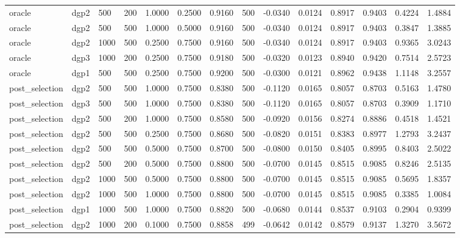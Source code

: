 \begin{tabular}{llllllllllllll}
oracle & dgp2 & 500 & 200 & 1.0000 & 0.2500 & 0.9160 & 500 & -0.0340 & 0.0124 & 0.8917 & 0.9403 & 0.4224 & 1.4884 \\
oracle & dgp2 & 500 & 500 & 1.0000 & 0.5000 & 0.9160 & 500 & -0.0340 & 0.0124 & 0.8917 & 0.9403 & 0.3847 & 1.3885 \\
oracle & dgp2 & 1000 & 500 & 0.2500 & 0.7500 & 0.9160 & 500 & -0.0340 & 0.0124 & 0.8917 & 0.9403 & 0.9365 & 3.0243 \\
oracle & dgp3 & 1000 & 200 & 0.2500 & 0.7500 & 0.9180 & 500 & -0.0320 & 0.0123 & 0.8940 & 0.9420 & 0.7514 & 2.5723 \\
oracle & dgp1 & 500 & 500 & 0.2500 & 0.7500 & 0.9200 & 500 & -0.0300 & 0.0121 & 0.8962 & 0.9438 & 1.1148 & 3.2557 \\
post\_selection & dgp2 & 500 & 500 & 1.0000 & 0.7500 & 0.8380 & 500 & -0.1120 & 0.0165 & 0.8057 & 0.8703 & 0.5163 & 1.4780 \\
post\_selection & dgp3 & 500 & 500 & 1.0000 & 0.7500 & 0.8380 & 500 & -0.1120 & 0.0165 & 0.8057 & 0.8703 & 0.3909 & 1.1710 \\
post\_selection & dgp2 & 500 & 200 & 1.0000 & 0.7500 & 0.8580 & 500 & -0.0920 & 0.0156 & 0.8274 & 0.8886 & 0.4518 & 1.4521 \\
post\_selection & dgp2 & 500 & 500 & 0.2500 & 0.7500 & 0.8680 & 500 & -0.0820 & 0.0151 & 0.8383 & 0.8977 & 1.2793 & 3.2437 \\
post\_selection & dgp2 & 500 & 500 & 0.5000 & 0.7500 & 0.8700 & 500 & -0.0800 & 0.0150 & 0.8405 & 0.8995 & 0.8403 & 2.5022 \\
post\_selection & dgp2 & 500 & 200 & 0.5000 & 0.7500 & 0.8800 & 500 & -0.0700 & 0.0145 & 0.8515 & 0.9085 & 0.8246 & 2.5135 \\
post\_selection & dgp2 & 1000 & 500 & 0.5000 & 0.7500 & 0.8800 & 500 & -0.0700 & 0.0145 & 0.8515 & 0.9085 & 0.5695 & 1.8357 \\
post\_selection & dgp2 & 1000 & 500 & 1.0000 & 0.7500 & 0.8800 & 500 & -0.0700 & 0.0145 & 0.8515 & 0.9085 & 0.3385 & 1.0084 \\
post\_selection & dgp1 & 1000 & 500 & 1.0000 & 0.7500 & 0.8820 & 500 & -0.0680 & 0.0144 & 0.8537 & 0.9103 & 0.2904 & 0.9399 \\
post\_selection & dgp2 & 1000 & 200 & 0.1000 & 0.7500 & 0.8858 & 499 & -0.0642 & 0.0142 & 0.8579 & 0.9137 & 1.3270 & 3.5672 \\
\hline
\end{tabular}
